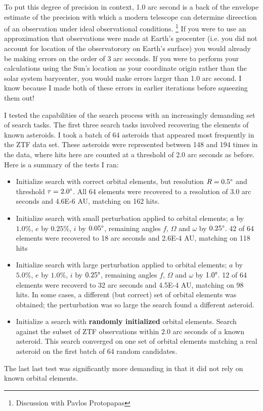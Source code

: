 To put this degree of precision in context, 1.0 arc second is a back of the envelope estimate of the 
precision with which a modern telescope can determine direection of an observation under ideal observational conditions.
\footnote{Discussion with Pavlos Protopapas}
If you were to use an approximation that observations were made at Earth's geocenter 
(i.e. you did not account for location of the observatorory on Earth's surface) 
you would already be making errors on the order of 3 arc seconds.
If you were to perform your calculations using the Sun's location as your coordinate origin rather than the solar system barycenter,
you would make errors larger than 1.0 arc second.
I know because I made both of these errors in earlier iterations before squeezing them out!

I tested the capabilities of the search process with an increasingly demanding set of search tasks.
The first three search tasks involved recovering the elements of known asteroids.
I took a batch of 64 asteroids that appeared most frequently in the ZTF data set.
These asteroids were represented between 148 and 194 times in the data, 
where hits here are counted at a threshold of 2.0 arc seconds as before.
Here is a summary of the tests I ran:
\begin{itemize}
\item Initialize search with correct orbital elements, but resolution $R = 0.5 \degree$ and threshold $\tau = 2.0 \degree$.
All 64 elements were recovered to a resolution of 3.0 arc seconds and 4.6E-6 AU, matching on 162 hits.
\item Initialize search with small perturbation applied to orbital elements; $a$ by $1.0\%$, $e$ by $0.25\%$, $i$ by $0.05 \degree$,
remaining angles $f$, $\Omega$ and $\omega$ by $0.25 \degree$.
42 of 64 elements were recovered to 18 arc seconds and 2.6E-4 AU, matching on 118 hits
\item Initialize search with large perturbation applied to orbital elements; $a$ by $5.0\%$, $e$ by $1.0\%$, $i$ by $0.25 \degree$,
remaining angles $f$, $\Omega$ and $\omega$ by $1.0 \degree$.
12 of 64 elements were recoverd to 32 arc seconds and 4.5E-4 AU, matching on 98 hits.
In some cases, a different (but correct) set of orbital elements was obtained;
the perturbation was so large the search found a different asteroid.
\item Initialize a search with \textbf{randomly initialized} orbital elements.
Search against the subset of ZTF observations within $2.0$ arc seconds of a known asteroid.
This search converged on one set of orbital elements matching a real asteroid on the first batch of 64 random candidates.
\end{itemize}
The last last test was significantly more demanding in that it did not rely on known orbital elements.

